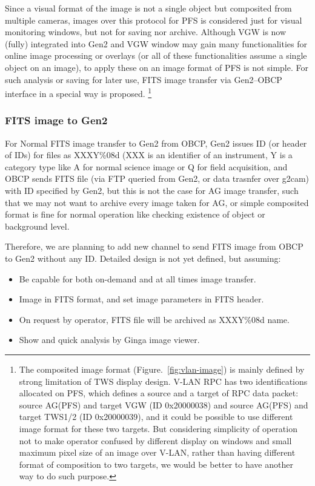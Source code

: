 \documentclass[a4paper,notitlepage]{article}
\begin{document}
Since a visual format of the image is not a single object but composited 
from multiple cameras, images over this protocol for PFS is considered just 
for visual monitoring windows, but not for saving nor archive. 
Although VGW is now (fully) integrated into Gen2 and VGW window may gain many 
functionalities for online image processing or overlays (or all of these 
functionalities assume a single object on an image), to apply these on an 
image format of PFS is not simple. For such analysis or saving for later use, 
FITS image transfer via Gen2--OBCP interface in a special way is proposed. 
\footnote{The composited image format (Figure.~\ref{fig:vlan-image}) is 
mainly defined by strong limitation of TWS display design. V-LAN RPC has 
two identifications allocated on PFS, which defines a source and a target of 
RPC data packet: source AG(PFS) and target VGW (ID 0x20000038) 
and source AG(PFS) and target TWS1/2 (ID 0x20000039), and it could be possible 
to use different image format for these two targets. 
But considering simplicity of operation not to make operator confused by 
different display on windows and small maximum pixel size of an image over 
V-LAN, rather than having different format of composition to two targets, 
we would be better to have another way to do such purpose.}


\subsubsection{FITS image to Gen2}

For Normal FITS image transfer to Gen2 from OBCP, 
Gen2 issues ID (or header of IDs) for files as XXXY\%08d (XXX is an identifier 
of an instrument, Y is a category type like A for normal science image or Q 
for field acquisition, and OBCP sends FITS file (via FTP queried from Gen2, 
or data trasnfer over g2cam) with ID specified by Gen2, but this is not the 
case for AG image transfer, such that we may not want to archive every image 
taken for AG, or simple composited format is fine for normal operation like 
checking existence of object or background level. 

Therefore, we are planning to add new channel to send FITS image from OBCP 
to Gen2 without any ID. Detailed design is not yet defined, but assuming: 
\begin{itemize}
  \item Be capable for both on-demand and at all times image transfer.
  \item Image in FITS format, and set image parameters in FITS header.
  \item On request by operator, FITS file will be archived as XXXY\%08d name.
  \item Show and quick analysis by Ginga image viewer.
\end{itemize}
\end{document}
